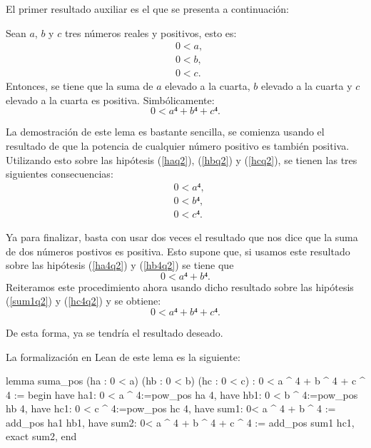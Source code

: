 El primer resultado auxiliar es el que se presenta a continuación:

\begin{lema}
  Sean \(a\), \(b\) y \(c\) tres números reales y positivos, esto es:
  \begin{align}
    &0<a, \label{haq2}\tag{ha}\\
    &0<b, \label{hbq2}\tag{hb}\\
    &0<c. \label{hcq2}\tag{hc}
  \end{align}
  Entonces, se tiene que la suma de \(a\) elevado a la cuarta, \(b\)
  elevado a la cuarta y \(c\) elevado a la cuarta es positiva.
  Simbólicamente:
  \begin{equation}
    0<a⁴+b⁴+c⁴.
  \end{equation}
\end{lema}
\begin{demostracion}
  La demostración de este lema es bastante sencilla, se comienza
  usando el resultado de que la potencia de cualquier número
  positivo es también positiva. Utilizando esto sobre las hipótesis
  (\ref{haq2}), (\ref{hbq2}) y (\ref{hcq2}), se tienen las tres
  siguientes consecuencias:
  \begin{align}
    &0<a⁴, \label{ha4q2}\tag{ha1}\\
    &0<b⁴, \label{hb4q2}\tag{hb1}\\
    &0<c⁴. \label{hc4q2}\tag{hc1}
  \end{align}

  Ya para finalizar, basta con usar dos veces el resultado que nos
  dice que la suma de dos números postivos es positiva. Esto supone
  que, si usamos este resultado sobre las hipótesis (\ref{ha4q2})
  y (\ref{hb4q2}) se tiene que
  \begin{equation}\label{sum1q2}\tag{sum1}
    0<a⁴+b⁴.
  \end{equation}
  Reiteramos este procedimiento ahora usando dicho resultado sobre
  las hipótesis (\ref{sum1q2}) y (\ref{hc4q2}) y se obtiene:
  \begin{equation}\tag{sum2}
    0<a⁴+b⁴+c⁴.
  \end{equation}

  De esta forma, ya se tendría el resultado deseado.
\end{demostracion}

La formalización en Lean de este lema es la siguiente:
\begin{leancode}
lemma suma_pos (ha : 0 < a) (hb : 0 < b) (hc : 0 < c) :
0 < a ^ 4 + b ^ 4 + c ^ 4 :=
begin
  have ha1: 0 < a ^ 4:=pow_pos ha 4,
  have hb1: 0 < b ^ 4:=pow_pos hb 4,
  have hc1: 0 < c ^ 4:=pow_pos hc 4,
  have sum1: 0< a ^ 4 + b ^ 4 := add_pos ha1 hb1,
  have sum2: 0< a ^ 4 + b ^ 4 + c ^ 4 := add_pos sum1 hc1,
  exact sum2,
end
\end{leancode}

